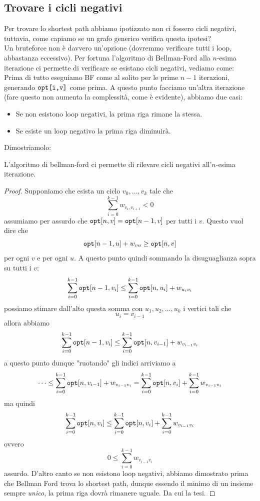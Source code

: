 \documentclass[11pt]{scrartcl}
\begin{document}
	\subsection{Trovare i cicli negativi}
	Per trovare lo shortest path abbiamo ipotizzato non ci fossero cicli negativi, tuttavia, come capiamo se un grafo generico verifica questa ipotesi? \\
	Un bruteforce non è davvero un'opzione (dovremmo verificare tutti i loop, abbastanza eccessivo). Per fortuna l'algoritmo di Bellman-Ford alla $n$-esima iterazione ci permette di verificare se esistano cicli negativi, vediamo come:\\
	Prima di tutto eseguiamo BF come al solito per le prime $n-1$ iterazioni, generando $\verb*|opt[i,v]|$ come prima. A questo punto facciamo un'altra iterazione (fare questo non aumenta la complessità, come è evidente), abbiamo due casi:
	\begin{itemize}
		\item Se non esistono loop negativi, la prima riga rimane la stessa.
		\item Se esiste un loop negativo la prima riga diminuirà.
	\end{itemize} 
	Dimostriamolo:
	\begin{lemma}
		L'algoritmo di bellman-ford ci permette di rilevare cicli negativi all'$n$-esima iterazione.
	\end{lemma}
	\begin{proof}
		Supponiamo che esista un ciclo $v_0,\dots,v_k$ tale che
		$$\sum_{i=0}^{k-1} w_{v_i,v_{i+1}}< 0$$
		assumiamo per assurdo che $\verb*|opt|[n,v]=\verb*|opt|[n-1,v]$ per tutti i $v$. Questo vuol dire che 
		$$\verb*|opt|[n-1,u]+w_{vu}\ge \verb*|opt|[n,v]$$
		per ogni $v$ e per ogni $u$. A questo punto quindi sommando la disuguaglianza sopra su tutti i $v$:
		$$\sum_{i=0}^{k-1}\verb*|opt|[n-1,v_i]\le \sum_{i=0}^{k-1}\verb*|opt|[n,u_i]+w_{u_iv_i}$$
		possiamo stimare dall'alto questa somma con $u_1,u_2,\dots,u_k$ i vertici tali che
		$$u_i=v_{i-1}$$
		allora abbiamo
		$$\sum_{i=0}^{k-1}\verb*|opt|[n-1,v_i]\le \sum_{i=0}^{k-1}\verb*|opt|[n,v_{i-1}]+w_{v_{i-1}v_i}$$
		a questo punto dunque "ruotando" gli indici arriviamo a 
		$$\dots \le \sum_{i=0}^{k-1}\verb*|opt|[n,v_{i-1}]+w_{v_{i-1}v_i}= \sum_{i=0}^{k-1}\verb*|opt|[n,v_{i}]+ \sum_{i=0}^{k-1}w_{v_{i-1}v_i}$$
		ma quindi
		$$\sum_{i=0}^{k-1}\verb*|opt|[n,v_{i}]\le\sum_{i=0}^{k-1}\verb*|opt|[n,v_{i}]+ \sum_{i=0}^{k-1}w_{v_{i-1}v_i}$$
		ovvero 
		$$0\le\sum_{i=0}^{k-1}w_{v_{i-1}v_i}$$
		assurdo. D'altro canto se non esistono loop negativi, abbiamo dimostrato prima che Bellman Ford trova lo shortest path, dunque essendo il minimo di un insieme sempre \textit{unico}, la prima riga dovrà rimanere uguale. Da cui la tesi.
	\end{proof}
	
\end{document}
